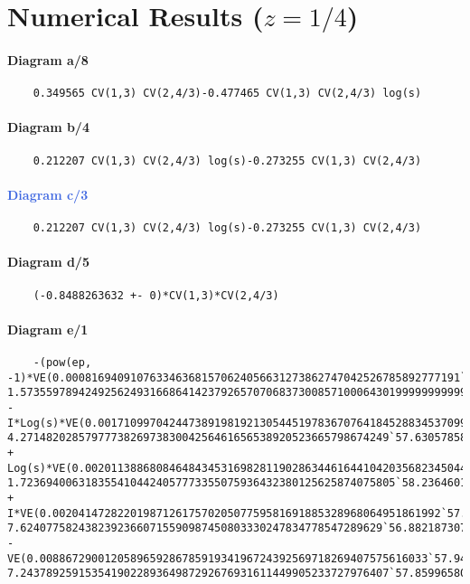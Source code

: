 \documentclass{article}
\newcommand{\CJ}[1]{\textcolor{RoyalBlue}{#1}}
\begin{document}
\section{Numerical Results ($z=1/4$)}
\paragraph{Diagram a/8}
\begin{verbatim}
    0.349565 CV(1,3) CV(2,4/3)-0.477465 CV(1,3) CV(2,4/3) log(s)
\end{verbatim}
\paragraph{Diagram b/4}
\begin{verbatim}
    0.212207 CV(1,3) CV(2,4/3) log(s)-0.273255 CV(1,3) CV(2,4/3)
\end{verbatim}
\paragraph{\CJ{Diagram c/3}}
\begin{verbatim}
    0.212207 CV(1,3) CV(2,4/3) log(s)-0.273255 CV(1,3) CV(2,4/3)
\end{verbatim}
\paragraph{Diagram d/5}
\begin{verbatim}
    (-0.8488263632 +- 0)*CV(1,3)*CV(2,4/3)
\end{verbatim}
\paragraph{Diagram e/1}
\begin{verbatim}
	-(pow(ep, -1)*VE(0.0008169409107633463681570624056631273862747042526785892777191`57.91219064520137, 1.573559789424925624931668641423792657070683730085710006430199999999999999999996`58.1968832491393*^-37)) - I*Log(s)*VE(0.001710997042447389198192130544519783670764184528834537099249`57.23324925883983, 4.271482028579777382697383004256461656538920523665798674249`57.63057858349424*^-39) + Log(s)*VE(0.0020113886808464843453169828119028634461644104203568234504405`58.303496001793235, 1.7236940063183554104424057773355075936432380125625874075805`58.23646017148736*^-39) + I*VE(0.002041472822019871261757020507759581691885328968064951861992`57.309943602566456, 7.62407758243823923660715590987450803330247834778547289629`56.88218730702342*^-7) - VE(0.008867290012058965928678591934196724392569718269407575616033`57.947790912657496, 7.243789259153541902289364987292676931611449905233727976407`57.85996580705919*^-7)
\end{verbatim}
\end{document}
